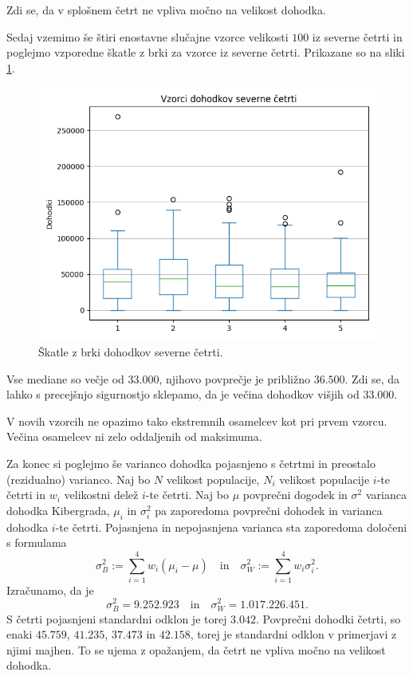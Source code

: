\documentclass[12pt, a4paper]{article}
\begin{document}
Zdi se, da v splošnem četrt ne vpliva močno na velikost dohodka.


Sedaj vzemimo še štiri enostavne slučajne vzorce velikosti $100$ 
iz severne četrti in poglejmo vzporedne škatle z brki za vzorce
iz severne četrti. Prikazane so na sliki \ref{img:sever}.
\begin{figure}[H]
    \centering
    \includegraphics[width=12cm]{sever.png}
    \caption{Škatle z brki dohodkov severne četrti.}
    \label{img:sever}
\end{figure}
Vse mediane so večje od $33.000$, njihovo povprečje je približno 
$36.500$. Zdi se, da lahko s precejšnjo sigurnostjo sklepamo, da je večina 
dohodkov višjih od $33.000$.

V novih vzorcih ne opazimo tako ekstremnih osamelcev kot pri prvem vzorcu. Večina 
osamelcev ni zelo oddaljenih od maksimuma.

Za konec si poglejmo še varianco dohodka pojasnjeno s četrtmi in preostalo
(rezidualno) varianco. Naj bo $N$ velikost populacije, $N_i$ velikost 
populacije $i$-te četrti in $w_i$ velikostni delež $i$-te četrti. Naj bo
$\mu$ povprečni dogodek in $\sigma^2$ varianca dohodka Kibergrada,
$\mu_i$ in $\sigma_i^2$ pa zaporedoma povprečni dohodek in varianca 
dohodka $i$-te četrti. Pojasnjena in nepojasnjena varianca sta zaporedoma 
določeni s formulama
\[
    \sigma^2_B := \sum_{i=1}^{4} w_i(\mu_i - \mu)
    \quad \text{in} \quad
    \sigma^2_W := \sum_{i=1}^{4} w_i\sigma_i^2.
\]
Izračunamo, da je 
\[
    \sigma^2_B = 9.252.923
    \quad \text{in} \quad
    \sigma^2_W = 1.017.226.451.
\]
S četrti pojasnjeni 
standardni odklon je torej $3.042$. Povprečni dohodki četrti, 
so enaki $45.759$, $41.235$, $37.473$ in $42.158$, torej je 
standardni odklon v primerjavi z njimi majhen. To se ujema z 
opažanjem, da četrt ne vpliva močno na velikost dohodka.
\newpage
\end{document}
